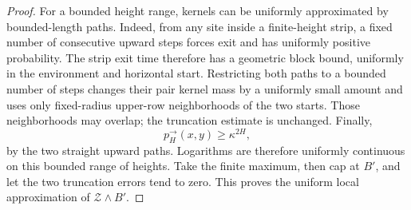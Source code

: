 \begin{proof}
For a bounded height range, kernels can be uniformly approximated by
bounded-length paths. Indeed, from any site inside a finite-height
strip, a fixed number of consecutive upward steps forces exit and has
uniformly positive probability. The strip exit time therefore has a
geometric block bound, uniformly in the environment and horizontal
start. Restricting both paths to a bounded number of steps changes
their pair kernel mass by a uniformly small amount and uses only
fixed-radius upper-row neighborhoods of the two starts. Those
neighborhoods may overlap; the truncation estimate is unchanged.
Finally,
\[
p_H^\to(x,y)\ge\kappa^{2H},
\]
by the two straight upward paths. Logarithms are therefore uniformly
continuous on this bounded range of heights. Take the finite maximum,
then cap at \(B'\), and let the two truncation errors tend to zero.
This proves the uniform local approximation of
\(\mathcal Z\wedge B'\).
\end{proof}
